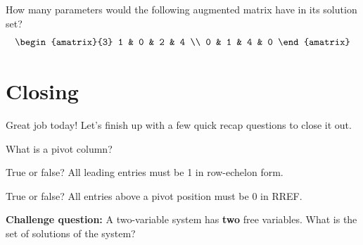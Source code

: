\documentclass[11pt]{exam}
\begin{document}
    \begin{questions}
        \item How many parameters would the following augmented matrix have in its solution set?
        $$\begin{amatrix}{3}
            1 & 0 & 2 & 4 \\
            0 & 1 & 4 & 0
        \end{amatrix}$$ 
    \end{questions}

\pagebreak
\section{Closing}
    Great job today! Let's finish up with a few quick recap questions to close it out.
    \begin{questions}
        \item What is a pivot column?
        \item True or false? All leading entries must be 1 in row-echelon form.
        \item True or false? All entries above a pivot position must be 0 in RREF.
        \item \textbf{Challenge question: } A two-variable system has \textbf{two} free variables. What is the set of solutions of the system? 
    \end{questions}
    
\end{document}
